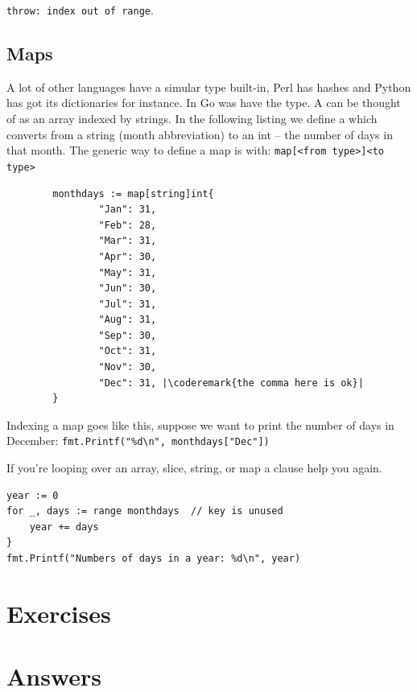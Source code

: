\noindent\lstinline{throw: index out of range}.

\subsection{Maps}
\label{sec:maps}
A lot of other languages have a simular type built-in, Perl has hashes
and Python has got its dictionaries for instance. In Go was have the
 type. A  can be thought of as an array indexed by
strings.
In the following listing we define a  which converts from a
string (month abbreviation) to an int -- the number of days in that month. 
The generic way to define a map is with: \verb|map[<from type>]<to type>|

\begin{lstlisting}
        monthdays := map[string]int{
                "Jan": 31, 
                "Feb": 28, 
                "Mar": 31, 
                "Apr": 30, 
                "May": 31, 
                "Jun": 30, 
                "Jul": 31, 
                "Aug": 31, 
                "Sep": 30, 
                "Oct": 31, 
                "Nov": 30, 
                "Dec": 31, |\coderemark{the comma here is ok}|
        }		    
\end{lstlisting}
Indexing a map goes like this, suppose we want to print the
number of days in December: \lstinline{fmt.Printf("%d\n", monthdays["Dec"])}

If you're looping over an array, slice, string, or map a  clause help you again.
\begin{lstlisting}
year := 0
for _, days := range monthdays  // key is unused
    year += days
}
fmt.Printf("Numbers of days in a year: %d\n", year)
\end{lstlisting}

\section{Exercises}







\cleardoublepage
\section{Answers}
\shipoutAnswer
